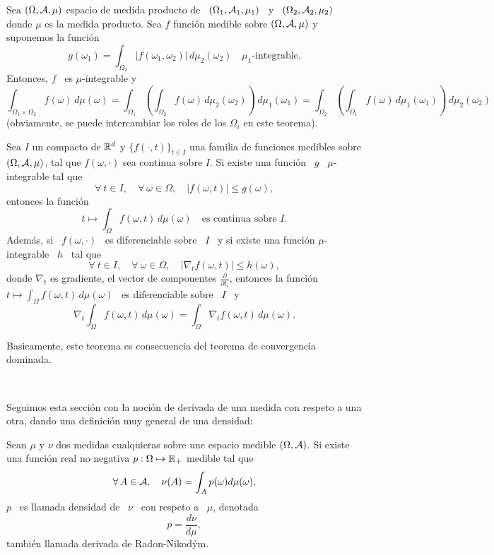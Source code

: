 {\begin{teorema}\label{Th:MP:Fubini}
  Sea  $(\Omega,\mathcal{A},\mu)$  espacio de  medida  producto  de  \ $(\Omega_1,  \mathcal{A}_1,
  \mu_1)$ \  y \ $(\Omega_2,  \mathcal{A}_2, \mu_2)$ donde  $\mu$ es la  medida producto.
  Sea $f$ funci\'on medible sobre $(\Omega,\mathcal{A},\mu)$ y suponemos la funci\'on
  \[
  g(\omega_1)   =  \int_{\Omega_2}   \left|   f(\omega_1,\omega_2)  \right|   \,
  d\mu_2(\omega_2) \quad \mu_1\mbox{-integrable}.
  \]
  Entonces, $f$ \ es $\mu$-integrable y
  \[
  \int_{\Omega_1  \times \Omega_2}  f(\omega) \,  d\mu(\omega)  = \int_{\Omega_1}
  \left(    \int_{\Omega_2}   f(\omega)    \,   d\mu_2(\omega_2)    \right)   \,
  d\mu_1(\omega_1)   =  \int_{\Omega_2}   \left(  \int_{\Omega_1}   f(\omega)  \,
    d\mu_1(\omega_1) \right) \, d\mu_2(\omega_2)
  \]
  (obviamente, se puede intercambiar los roles de los $\Omega_i$ en este teorema).
\end{teorema}
%
\begin{teorema}\label{Th:MP:IntegralParametro}
  Sea $I$ un compacto de $\mathbb{R}^d$ y $\{ f(\cdot,t) \}_{t \in I}$ una familia de
  funciones  medibles  sobre $(\Omega,\mathcal{A},\mu)$,  tal  que $f(\omega,\cdot)$  sea
  continua sobre $I$. Si existe una funci\'on \ $g$ \ $\mu$-integrable tal que
  \[
  \forall \:  t \in I, \quad  \forall \: \omega \in  \Omega, \quad |f(\omega,t)|
  \le g(\omega),
  \]
  entonces la funci\'on
  \[
  t  \mapsto \int_\Omega  f(\omega,t)  \, d\mu(\omega)  \quad \mbox{es  continua
    sobre \ } I.
  \]
  Adem\'as, si \ $f(\omega,\cdot)$ \ es  diferenciable sobre \ $I$ \ y si existe
  una funci\'on $\mu$-integrable \ $h$ \ tal que
  \[
  \forall \: t \in I, \quad  \forall \: \omega \in \Omega, \quad \left| \nabla_t
    f(\omega,t) \right| \le h(\omega),
  \]
  donde   $\nabla_t$    es   gradiente,    \ie   el   vector    de   componentes
  $\frac{\partial}{\partial  t_i}$,  entonces la  funci\'on  \ $\displaystyle  t
  \mapsto \int_\Omega  f(\omega,t) \, d\mu(\omega)$  \ es diferenciable  sobre \
  $I$ \ y
  \[
  \nabla_t  \int_\Omega  f(\omega,t)  \,  d\mu(\omega)  =  \int_\Omega  \nabla_t
  f(\omega,t) \, d\mu(\omega).
  \]
\end{teorema}
%
Basicamente, este teorema es  consecuencia del teorema de convergencia dominada.
}

\

Seguimos esta secci\'on con la noci\'on  de derivada de una medida con respeto a
una otra, dando una definici\'on muy general de una densidad:
%
\begin{definicion}\label{Def:MP:DensidadMedida}
  Sean  $\mu$  y  $\nu$  dos  medidas  cualquieras  sobre  une  espacio  medible
  $(\Omega,\mathcal{A})$.  Si  existe una funci\'on  real no negativa $p:  \Omega \mapsto
  \mathbb{R}_+$ medible tal que
  \[
  \forall \, A \in \mathcal{A}, \quad \nu(A) = \int_A p(\omega) d\mu(\omega),
  \]
  $p$ \ es llamada densidad de \ $\nu$ \ con respeto a \ $\mu$, denotada
  \[
  p = \frac{d\nu}{d\mu},
  \]
  tambi\'en llamada derivada de Radon-Nikod\'ym.
\end{definicion}


